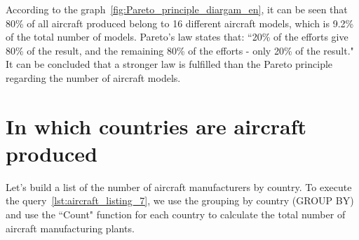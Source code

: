 \begin{figure*}[h]

    \setlength{\fboxsep}{0pt}%
    \setlength{\fboxrule}{1pt}%

	\caption{Percentage of the number of aircraft models produced by all airlines to the total number of aircraft manufactured for all time, 2020.}%
    \label{fig:Pareto_principle_diargam_en}%
\end{figure*}

According to the graph~\ref{fig:Pareto_principle_diargam_en}, it can be seen that 80\% of all aircraft produced belong to 16 different aircraft 
models, which is 9.2\% of the total number of models. Pareto's law states that: ``20\% of the efforts give 80\% of the result, and the remaining 80\%
 of the efforts - only 20\% of the result." It can be concluded that a stronger law is fulfilled than the Pareto principle regarding the number 
 of aircraft models.

\label{question:aircraft_question_3}


\section{In which countries are aircraft produced}

Let's build a list of the number of aircraft manufacturers by country. To execute the query~\ref{lst:aircraft_listing_7}, we use the grouping 
by country (GROUP BY) and use the ``Count" function for each country to calculate the total number of aircraft manufacturing plants.

